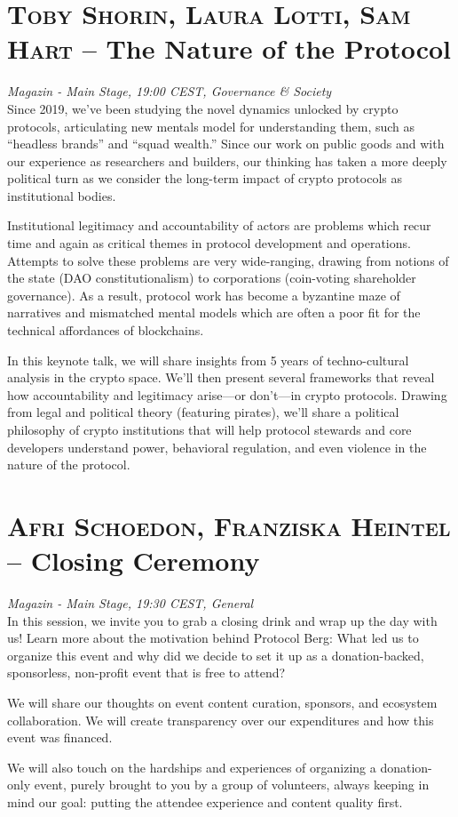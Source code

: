 \section {\textsc{Toby Shorin, Laura Lotti, Sam Hart} -- The Nature of the Protocol
} \noindent \textit {Magazin - Main Stage, 19:00 CEST, Governance \&
 Society
}\\[1em] Since 2019, we've been studying the novel dynamics unlocked by crypto protocols, articulating new mentals model for understanding them, such as ``headless brands'' and ``squad wealth.'' Since our work on public goods and with our experience as researchers and builders, our thinking has taken a more deeply political turn as we consider the long-term impact of crypto protocols as institutional bodies.

Institutional legitimacy and accountability of actors are problems which recur time and again as critical themes in protocol development and operations. Attempts to solve these problems are very wide-ranging, drawing from notions of the state (DAO constitutionalism) to corporations (coin-voting shareholder governance). As a result, protocol work has become a byzantine maze of narratives and mismatched mental models which are often a poor fit for the technical affordances of blockchains.

In this keynote talk, we will share insights from 5 years of techno-cultural analysis in the crypto space. We'll then present several frameworks that reveal how accountability and legitimacy arise---or don't---in crypto protocols. Drawing from legal and political theory (featuring pirates), we'll share a political philosophy of crypto institutions that will help protocol stewards and core developers understand power, behavioral regulation, and even violence in the nature of the protocol.
\clearpage
\section {\textsc{Afri Schoedon, Franziska Heintel} -- Closing Ceremony
} \noindent \textit {Magazin - Main Stage, 19:30 CEST, General
}\\[1em] In this session, we invite you to grab a closing drink and wrap up the day with us! Learn more about the motivation behind Protocol Berg: What led us to organize this event and why did we decide to set it up as a donation-backed, sponsorless, non-profit event that is free to attend?

We will share our thoughts on event content curation, sponsors, and ecosystem collaboration. We will create transparency over our expenditures and how this event was financed.

We will also touch on the hardships and experiences of organizing a donation-only event, purely brought to you by a group of volunteers, always keeping in mind our goal: putting the attendee experience and content quality first.
\clearpage
\cleardoublepage

